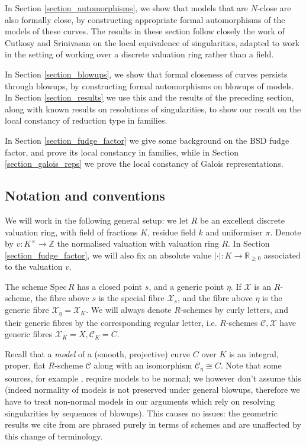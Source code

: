 \documentclass{article}
\theoremstyle{definition}
\theoremstyle{plain}
\theoremstyle{remark}
\newcommand{\spec}{\mathrm{Spec}\,}
\begin{document}
	In Section \ref{section_automorphisms}, we show that models that are $N$-close are also formally close, by constructing appropriate formal automorphisms of the models of these curves. The results in these section follow closely the work of Cutkosy and Srinivasan \cite{Cutkosky_Srinivasan_1993} on the local equivalence of singularities, adapted to work in the setting of working over a discrete valuation ring rather than a field.
	
	In Section \ref{section_blowups}, we show that formal closeness of curves persists through blowups, by constructing formal automorphisms on blowups of models.  In Section \ref{section_results} we use this and the results of the preceding section, along with known results on resolutions of singularities, to show our result on the local constancy of reduction type in families.
	
	In Section \ref{section_fudge_factor} we give some background on the BSD fudge factor, and prove its local constancy in families, while in Section \ref{section_galois_reps} we prove the local constancy of Galois representations.
	\subsection{Notation and conventions}
	We will work in the following general setup: we let $R$ be an excellent discrete valuation ring, with field of fractions $K$, residue field $k$ and uniformiser $\pi$. Denote by $v: K^\times \to \mathbb{Z}$ the normalised valuation with valuation ring $R$. In Section \ref{section_fudge_factor}, we will also fix an absolute value $|\cdot|: K\to \mathbb{R}_{\ge 0}$ associated to the valuation $v$.
	
	The scheme $\spec R$ has a closed point $s$, and a generic point $\eta$. If $\mathcal{X}$ is an $R$-scheme, the fibre above $s$ is the special fibre $\mathcal{X}_s$, and the fibre above $\eta$ is the generic fibre $\mathcal{X}_\eta = \mathcal{X}_K$. We will always denote $R$-schemes by curly letters, and their generic fibres by the corresponding regular letter, i.e.  $R$-schemes $\mathcal{C},\mathcal{X}$ have generic fibres $\mathcal{X}_K = X, \mathcal{C}_K = C$. 
	
	Recall that a \emph{model} of a (smooth, projective) curve $C$ over $K$ is an integral, proper, flat $R$-scheme $\mathcal{C}$ along with an isomorphism $\mathcal{C}_{\eta}\cong C$. Note that some sources, for example \cite{liu2002algebraic}, require models to be normal; we however don't assume this (indeed normality of models is not preserved under general blowups, therefore we have to treat non-normal models in our arguments which rely on resolving singularities by sequences of blowups). This causes no issues: the geometric results we cite from \cite{liu2002algebraic} are phrased purely in terms of schemes and are unaffected by this change of terminology.
	
\end{document}
